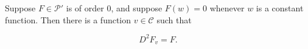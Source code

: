 Suppose $F \in \mathcal{P}'$ is of order $0$, and suppose $F(w) = 0$ whenever $w$ is a constant function. Then there is a function $v \in \mathcal{C}$ such that

$$D^2 F_v = F.$$
